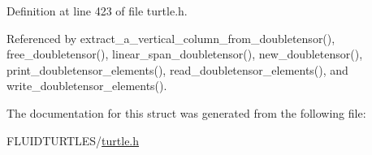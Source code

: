 Definition at line 423 of file turtle.\-h.



Referenced by extract\-\_\-a\-\_\-vertical\-\_\-column\-\_\-from\-\_\-doubletensor(), free\-\_\-doubletensor(), linear\-\_\-span\-\_\-doubletensor(), new\-\_\-doubletensor(), print\-\_\-doubletensor\-\_\-elements(), read\-\_\-doubletensor\-\_\-elements(), and write\-\_\-doubletensor\-\_\-elements().



The documentation for this struct was generated from the following file\-:\begin{DoxyCompactItemize}
\item 
F\-L\-U\-I\-D\-T\-U\-R\-T\-L\-E\-S/\hyperlink{turtle_8h}{turtle.\-h}\end{DoxyCompactItemize}
